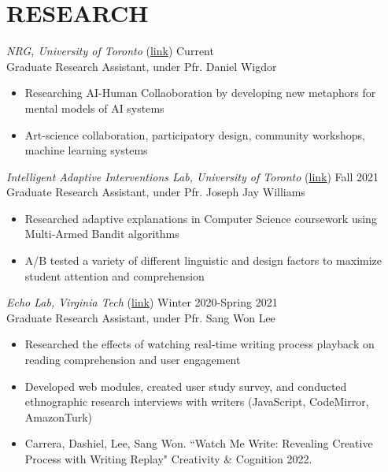 \section{RESEARCH}

{\sl NRG, University of Toronto} (\href{https://www.dgp.toronto.edu/~dwigdor/}{link})\hfill
Current \\
Graduate Research Assistant, under Pfr. Daniel Wigdor \\
\begin{itemize}
\item Researching AI-Human Collaoboration by developing new metaphors for mental models of AI systems
\item  Art-science collaboration, participatory design, community workshops, machine learning systems
\end{itemize}

{\sl Intelligent Adaptive Interventions Lab, University of Toronto} (\href{http://www.josephjaywilliams.com/}{link})\hfill
Fall 2021 \\
Graduate Research Assistant, under Pfr. Joseph Jay Williams \\
\begin{itemize}
\item Researched adaptive explanations in Computer Science coursework using Multi-Armed Bandit algorithms
\item A/B tested a variety of different linguistic and design factors to maximize student attention and comprehension
\end{itemize}

{\sl Echo Lab, Virginia Tech }(\href{http://people.cs.vt.edu/sangwonlee/}{link})\hfill
Winter 2020-Spring 2021 \\
Graduate Research Assistant, under Pfr. Sang Won Lee \\
\begin{itemize} 
\item Researched the effects of watching real-time writing process playback on reading comprehension and user engagement
\item Developed web modules, created user study survey, and conducted ethnographic research interviews with writers (JavaScript, CodeMirror, AmazonTurk)
\item Carrera, Dashiel, Lee, Sang Won. ``Watch Me Write: Revealing Creative Process with Writing Replay" Creativity \& Cognition 2022.\\
\end{itemize} 

